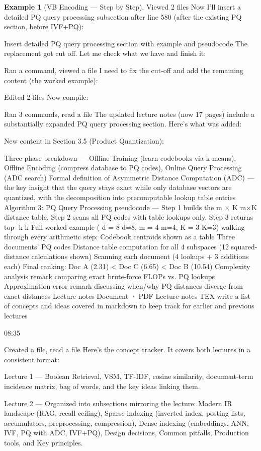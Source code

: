 \documentclass[aspectratio=169]{beamer} \usetheme{TUDelft} %
\theoremstyle{definition}
\newtheorem{example}{Example}[section]
\theoremstyle{plain}
\begin{document}
\begin{example}[VB Encoding --- Step by Step]
Viewed 2 files
Now I'll insert a detailed PQ query processing subsection after line 580 (after the existing PQ section, before IVF+PQ):


Insert detailed PQ query processing section with example and pseudocode
The replacement got cut off. Let me check what we have and finish it:


Ran a command, viewed a file
I need to fix the cut-off and add the remaining content (the worked example):


Edited 2 files
Now compile:


Ran 3 commands, read a file
The updated lecture notes (now 17 pages) include a substantially expanded PQ query processing section. Here's what was added:

New content in Section 3.5 (Product Quantization):

Three-phase breakdown — Offline Training (learn codebooks via k-means), Offline Encoding (compress database to PQ codes), Online Query Processing (ADC search)
Formal definition of Asymmetric Distance Computation (ADC) — the key insight that the query stays exact while only database vectors are quantized, with the decomposition into precomputable lookup table entries
Algorithm 3: PQ Query Processing pseudocode — Step 1 builds the 
m
×
K
m×K distance table, Step 2 scans all PQ codes with table lookups only, Step 3 returns top-
k
k
Full worked example (
d
=
8
d=8, 
m
=
4
m=4, 
K
=
3
K=3) walking through every arithmetic step:
Codebook centroids shown as a table
Three documents' PQ codes
Distance table computation for all 4 subspaces (12 squared-distance calculations shown)
Scanning each document (4 lookups + 3 additions each)
Final ranking: Doc A (2.31) < Doc C (6.65) < Doc B (10.54)
Complexity analysis remark comparing exact brute-force FLOPs vs. PQ lookups
Approximation error remark discussing when/why PQ distances diverge from exact distances
Lecture notes
Document · PDF 
Lecture notes
TEX 
write a list of concepts and ideas covered in markdown to keep track for earlier and previous lectures

08:35

Created a file, read a file
Here's the concept tracker. It covers both lectures in a consistent format:

Lecture 1 — Boolean Retrieval, VSM, TF-IDF, cosine similarity, document-term incidence matrix, bag of words, and the key ideas linking them.

Lecture 2 — Organized into subsections mirroring the lecture: Modern IR landscape (RAG, recall ceiling), Sparse indexing (inverted index, posting lists, accumulators, preprocessing, compression), Dense indexing (embeddings, ANN, IVF, PQ with ADC, IVF+PQ), Design decisions, Common pitfalls, Production tools, and Key principles.


\end{example}
\end{document}
